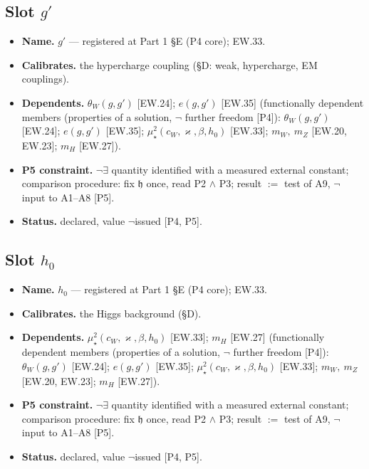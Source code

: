 \documentclass[11pt,openany]{report}
\theoremstyle{canonplain}
\theoremstyle{canondef}
\begin{document}
\subsection*{Slot $g'$}
\begin{itemize}\setlength{\itemsep}{2pt}
\item \textbf{Name.} $g'$ — registered at Part 1 §E (P4 core); EW.33.
\item \textbf{Calibrates.} the hypercharge coupling (§D: weak, hypercharge, EM couplings).
\item \textbf{Dependents.} $\theta_W(g,g')$ [EW.24]; $e(g,g')$ [EW.35] (functionally dependent members (properties of a solution, $\neg$ further freedom [P4]): $\theta_W(g,g')$ [EW.24]; $e(g,g')$ [EW.35]; $\mu_\star^2(c_W,\varkappa,\beta,h_0)$ [EW.33]; $m_W,\ m_Z$ [EW.20, EW.23]; $m_H$ [EW.27]).
\item \textbf{P5 constraint.} $\neg\exists$ quantity identified with a measured external constant; comparison procedure: fix $\mathfrak h$ once, read P2 $\wedge$ P3; result $:=$ test of A9, $\neg$ input to A1--A8 [P5].
\item \textbf{Status.} declared, value $\neg$issued [P4, P5].
\end{itemize}
\subsection*{Slot $h_0$}
\begin{itemize}\setlength{\itemsep}{2pt}
\item \textbf{Name.} $h_0$ — registered at Part 1 §E (P4 core); EW.33.
\item \textbf{Calibrates.} the Higgs background (§D).
\item \textbf{Dependents.} $\mu_\star^2(c_W,\varkappa,\beta,h_0)$ [EW.33]; $m_H$ [EW.27] (functionally dependent members (properties of a solution, $\neg$ further freedom [P4]): $\theta_W(g,g')$ [EW.24]; $e(g,g')$ [EW.35]; $\mu_\star^2(c_W,\varkappa,\beta,h_0)$ [EW.33]; $m_W,\ m_Z$ [EW.20, EW.23]; $m_H$ [EW.27]).
\item \textbf{P5 constraint.} $\neg\exists$ quantity identified with a measured external constant; comparison procedure: fix $\mathfrak h$ once, read P2 $\wedge$ P3; result $:=$ test of A9, $\neg$ input to A1--A8 [P5].
\item \textbf{Status.} declared, value $\neg$issued [P4, P5].
\end{itemize}
\end{document}
